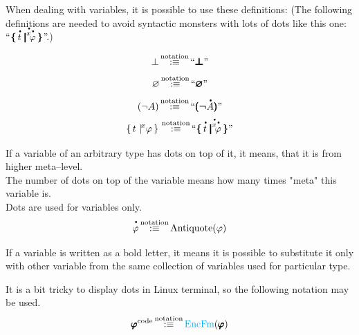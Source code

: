 \begin{metanotation}
When dealing with variables, it is possible to use these definitions:
(The following definitions are needed to avoid syntactic monsters with lots of dots like this one: ``$\boldccc{\meta{x}}{\meta{t}}{\meta{\phi}}$''.)

\[
\bot
\,{\stackrel{{\textrm{notation}}}{:\equiv}}\,
``
\pmb{\bm{\bot}}
"
\]
\[
\emptyclass
\equivnot
\myquote{
\pmb{\emptyclass}
}
\]
\[
\thinneg{A} \equivnot ``\boldneg{\meta{A}}"
\]
\[
\ccc{x}{t}{\phi}
\equivnot
``
\boldccc{\meta{x}}{\meta{t}}{\meta{\phi}}
"
\]

\begin{notation}[dot]
If a variable of an arbitrary type has dots on top of it, it means, that it is from higher meta--level.\\
The number of dots on top of the variable means how many times "meta" this variable is.\\
Dots are used for variables only.\\
\[
\meta{\phi} \equivnot \Antiquote(\phi)
\]
\end{notation}

\begin{notation}
If a variable is written as a bold letter, it means it is possible to substitute it only with other variable from the same collection of variables used for particular type.
\end{notation}


\begin{notation}
It is a bit tricky to display dots in Linux terminal, so the following notation may be used.
\[
\pmb{\varphi}^\text{code} \,{\stackrel{{\textrm{notation}}}{:\equiv}}\, {\text{\textcolor{cyan}{EncFm}}}(\pmb{\varphi})
\]%
\end{notation}

\begin{definition}%


\end{definition}
\end{metanotation}
